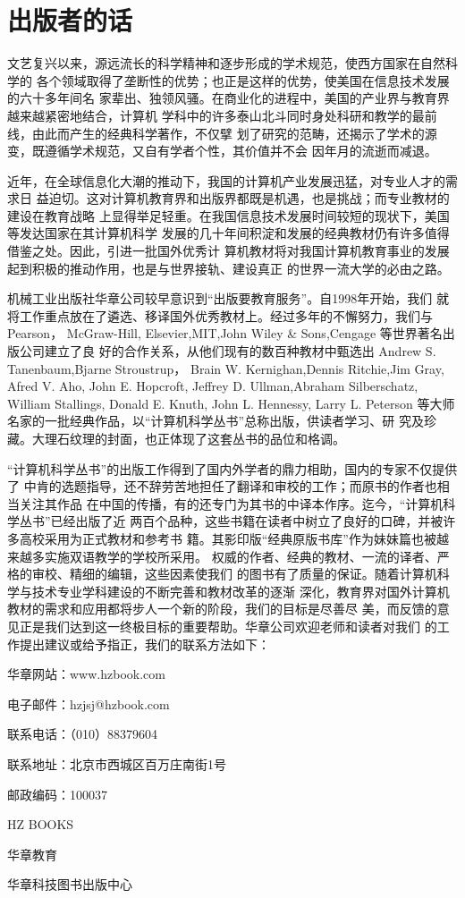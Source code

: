 
\chapter*{出版者的话}

文艺复兴以来，源远流长的科学精神和逐步形成的学术规范，使西方国家在自然科学的
各个领域取得了垄断性的优势；也正是这样的优势，使美国在信息技术发展的六十多年间名
家辈出、独领风骚。在商业化的进程中，美国的产业界与教育界越来越紧密地结合，计算机
学科中的许多泰山北斗同时身处科研和教学的最前线，由此而产生的经典科学著作，不仅擘
划了研究的范畴，还揭示了学术的源变，既遵循学术规范，又自有学者个性，其价值并不会
因年月的流逝而减退。

近年，在全球信息化大潮的推动下，我国的计算机产业发展迅猛，对专业人才的需求日
益迫切。这对计算机教育界和出版界都既是机遇，也是挑战；而专业教材的建设在教育战略
上显得举足轻重。在我国信息技术发展时间较短的现状下，美国等发达国家在其计算机科学
发展的几十年间积淀和发展的经典教材仍有许多值得借鉴之处。因此，引进一批国外优秀计
算机教材将对我国计算机教育事业的发展起到积极的推动作用，也是与世界接轨、建设真正
的世界一流大学的必由之路。

机械工业出版社华章公司较早意识到“出版要教育服务”。自1998年开始，我们
就将工作重点放在了遴选、移译国外优秀教材上。经过多年的不懈努力，我们与 Pearson，
McGraw-Hill, Elsevier,MIT,John Wiley \& Sons,Cengage 等世界著名出版公司建立了良
好的合作关系，从他们现有的数百种教材中甄选出 Andrew S. Tanenbaum,Bjarne Stroustrup，
Brain W. Kernighan,Dennis Ritchie,Jim Gray, Afred V. Aho, John E.
Hopcroft, Jeffrey D.
Ullman,Abraham Silberschatz, William Stallings, Donald E. Knuth, John
L. Hennessy, Larry L.
Peterson 等大师名家的一批经典作品，以“计算机科学丛书”总称出版，供读者学习、研
究及珍藏。大理石纹理的封面，也正体现了这套丛书的品位和格调。

“计算机科学丛书”的出版工作得到了国内外学者的鼎力相助，国内的专家不仅提供了
中肯的选题指导，还不辞劳苦地担任了翻译和审校的工作；而原书的作者也相当关注其作品
在中国的传播，有的还专门为其书的中译本作序。迄今，“计算机科学丛书”已经出版了近
两百个品种，这些书籍在读者中树立了良好的口碑，并被许多高校采用为正式教材和参考书
籍。其影印版“经典原版书库”作为妹妹篇也被越来越多实施双语教学的学校所采用。
权威的作者、经典的教材、一流的译者、严格的审校、精细的编辑，这些因素使我们
的图书有了质量的保证。随着计算机科学与技术专业学科建设的不断完善和教材改革的逐渐
深化，教育界对国外计算机教材的需求和应用都将步人一个新的阶段，我们的目标是尽善尽
美，而反馈的意见正是我们达到这一终极目标的重要帮助。华章公司欢迎老师和读者对我们
的工作提出建议或给予指正，我们的联系方法如下：

华章网站：www.hzbook.com

电子邮件：hzjsj@hzbook.com

联系电话：（010）88379604

联系地址：北京市西城区百万庄南街1号

邮政编码：100037

HZ BOOKS

华章教育

华章科技图书出版中心
